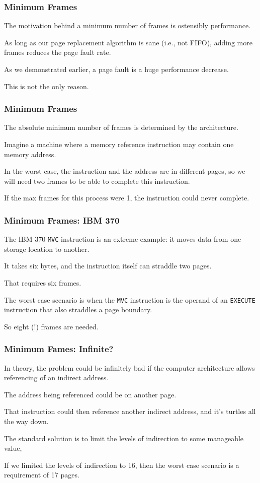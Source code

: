 \begin{frame}
\frametitle{Minimum Frames}

The motivation behind a minimum number of frames is ostensibly performance. 

As long as our page replacement algorithm is sane (i.e., not FIFO), adding more frames reduces the page fault rate. 

As we demonstrated earlier, a page fault is a huge performance decrease. 

This is not the only reason.

\end{frame}

\begin{frame}
\frametitle{Minimum Frames}

The absolute minimum number of frames is determined by the architecture. 

Imagine a machine where a memory reference instruction may contain one memory address.

In the worst case, the instruction and the address are in different pages, so we will need two frames to be able to complete this instruction.

If the max frames for this process were 1, the instruction could never complete.

\end{frame}

\begin{frame}
\frametitle{Minimum Frames: IBM 370}

The IBM 370 \texttt{MVC} instruction is an extreme example: it moves data from one storage location to another. 

It takes six bytes, and the instruction itself can straddle two pages. 

That requires six frames. 

The worst case scenario is when the \texttt{MVC} instruction is the operand of an \texttt{EXECUTE} instruction that also straddles a page boundary. 

So eight (!) frames are needed.


\end{frame}

\begin{frame}
\frametitle{Minimum Fames: Infinite?}

In theory, the problem could be infinitely bad if the computer architecture allows referencing of an indirect address. 

The address being referenced could be on another page. 

That instruction could then reference another indirect address, and it's turtles all the way down.

The standard solution is to limit the levels of indirection to some manageable value, 

If we limited the levels of indirection to 16, then the worst case scenario is a requirement of 17 pages.

\end{frame}

